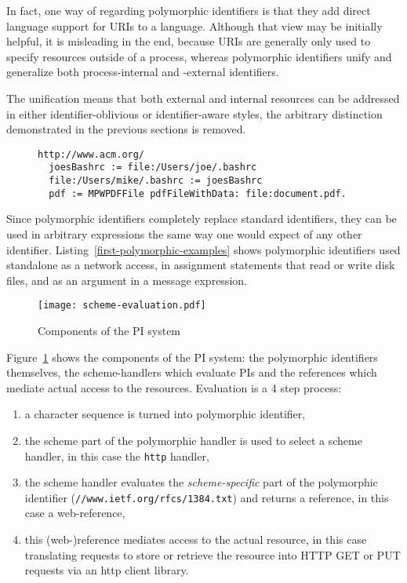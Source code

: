 \documentclass[preprint,authoryear]{acm_proc_article-sp}
\newcommand\mpw[1]{\mynote{Marcel}{#1}}
\begin{document}
In fact, one way of regarding polymorphic identifiers is that they add direct language support
for URIs to a language.  Although that view may be initially helpful, it is misleading in
the end, because URIs are generally only used to specify resources outside of a process,
whereas polymorphic identifiers unify and generalize both process-internal and -external identifiers.
\mpw{Less of an apology}


The unification means that both external and internal resources can be addressed in either
identifier-oblivious or identifier-aware styles, the arbitrary distinction demonstrated in
the previous sections is removed.

\mpw{no longer needed}
\begin{figure}[htbp]
\begin{lstlisting}[style=L,label=first-polymorphic-examples,caption=\emph{Polymorphic identifiers} in simple expressions.]
  http://www.acm.org/
  joesBashrc := file:/Users/joe/.bashrc
  file:/Users/mike/.bashrc := joesBashrc
  pdf := MPWPDFFile pdfFileWithData: file:document.pdf.
\end{lstlisting}
\end{figure}

Since polymorphic identifiers completely replace standard identifiers, they can be used
in arbitrary expressions the same way one would expect of any other identifier.  
Listing~\ref{first-polymorphic-examples} shows polymorphic identifiers used 
standalone as a network access, in assignment statements that read or write disk files,
and as an argument in a message expression.

\begin{figure}[htbp]
\label{scheme-eval}
\begin{center}
\texttt{[image: scheme-evaluation.pdf]}
\caption{Components of the PI system}
\end{center}
\end{figure}

Figure~\ref{scheme-eval} shows the components of the PI system:  the polymorphic
identifiers themselves, the scheme-handlers which evaluate PIs and the references
which mediate actual access to the resources.  Evaluation is a 4 step process:

\begin{enumerate}
\item a character sequence is turned into  polymorphic identifier,
\item the scheme part of the polymorphic handler is used to select a scheme handler, in this case the {\tt http} handler,
\item the scheme handler evaluates the {\em scheme-specific} part of the polymorphic identifier ({\tt //www.ietf.org/rfcs/1384.txt})
	 and returns a reference, in this case a web-reference,
\item this (web-)reference mediates access to the actual resource, in this case translating requests to store or retrieve the 
	resource into HTTP GET or PUT requests via an http client library.
\end{enumerate}
\end{document}
